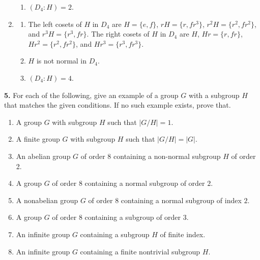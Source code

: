 \documentclass[10pt,]{book}
\theoremstyle{plain}
\theoremstyle{definition}
\theoremstyle{definition}
\theoremstyle{definition}
\theoremstyle{definition}
\numberwithin{equation}{section}
\begin{document}
\begin{enumerate}[label=(\alph*)]
\begin{enumerate}[label=\roman*.]
\item\hypertarget{li-440}{}
            \((D_4:H)=2\).
\end{enumerate}
%
\item\hypertarget{li-441}{}%
\begin{enumerate}[label=\roman*.]
\item\hypertarget{li-442}{}
            The left cosets of \(H\) in \(D_4\) are \(H=\{e,f\}\), \(rH=\{r,fr^3\}\), \(r^2H=\{r^2,fr^2\}\), and \(r^3H=\{r^3, fr\}\). The right cosets of \(H\) in \(D_4\) are \(H\), \(Hr=\{r, fr\}\), \(Hr^2=\{r^2,fr^2\}\), and \(Hr^3=\{r^3, fr^3\}\).
\item\hypertarget{li-443}{}
            \(H\) is not normal in \(D_4\).
\item\hypertarget{li-444}{}
            \((D_4:H)=4\).
\end{enumerate}
%
\end{enumerate}
\par\smallskip
\noindent\textbf{5.}\quad{}
        For each of the following, give an example of a group \(G\) with a subgroup \(H\) that matches the given conditions. If no such example exists, prove that.
        \leavevmode%
\begin{enumerate}[label=(\alph*)]
\item\hypertarget{li-445}{}
              A group \(G\) with subgroup \(H\) such that \(|G/H|=1\).
\item\hypertarget{li-446}{}
              A finite group \(G\) with subgroup \(H\) such that \(|G/H|=|G|\).
\item\hypertarget{li-447}{}
              An abelian group \(G\) of order \(8\) containing a non-normal subgroup \(H\) of order 2.
\item\hypertarget{li-448}{}
              A group \(G\) of order 8 containing a normal subgroup of order \(2\).
\item\hypertarget{li-449}{}
              A nonabelian group \(G\) of order 8 containing a normal subgroup of index \(2\).
\item\hypertarget{li-450}{}
              A group \(G\) of order 8 containing a subgroup of order \(3\).
\item\hypertarget{li-451}{}
              An infinite group \(G\) containing a subgroup \(H\) of finite index.
\item\hypertarget{li-452}{}
              An infinite group \(G\) containing a finite nontrivial subgroup \(H\).
\end{enumerate}
\end{document}
